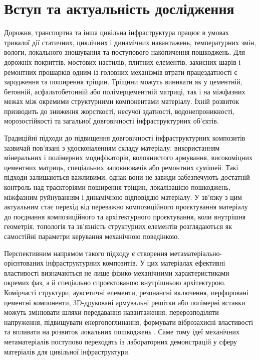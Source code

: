 \documentclass[12pt,a4paper]{article}
\begin{document}
\section{Вступ та актуальність дослідження}

Дорожня, транспортна та інша цивільна інфраструктура працює в умовах тривалої дії статичних, циклічних і динамічних навантажень, температурних змін, вологи, локального зношування та поступового накопичення пошкоджень. Для дорожніх покриттів, мостових настилів, плитних елементів, захисних шарів і ремонтних прошарків одним із головних механізмів втрати працездатності є зародження та поширення тріщин. Тріщини можуть виникати як у цементній, бетонній, асфальтобетонній або полімерцементній матриці, так і на міжфазних межах між окремими структурними компонентами матеріалу. Їхній розвиток призводить до зниження жорсткості, несучої здатності, водонепроникності, морозостійкості та загальної довговічності інфраструктурних об'єктів.

Традиційні підходи до підвищення довговічності інфраструктурних композитів зазвичай пов'язані з удосконаленням складу матеріалу: використанням мінеральних і полімерних модифікаторів, волокнистого армування, високоміцних цементних матриць, спеціальних заповнювачів або ремонтних сумішей. Такі підходи залишаються важливими, однак вони не завжди забезпечують достатній контроль над траєкторіями поширення тріщин, локалізацією пошкоджень, міжфазним руйнуванням і динамічною відповіддю матеріалу. У зв'язку з цим актуальним стає перехід від переважно композиційного проєктування матеріалу до поєднання композиційного та архітектурного проєктування, коли внутрішня геометрія, топологія та зв'язність структурних елементів розглядаються як самостійні параметри керування механічною поведінкою.

Перспективним напрямом такого підходу є створення метаматеріально-орієнтованих інфраструктурних композитів. У цих матеріалах ефективні властивості визначаються не лише фізико-механічними характеристиками окремих фаз, а й спеціально спроєктованою внутрішньою архітектурою. Комірчасті структури, ауксетичні елементи, резонансні включення, перфоровані цементні компоненти, 3D-друковані армувальні решітки або полімерні вставки можуть змінювати шляхи передавання навантаження, перерозподіляти напруження, підвищувати енергопоглинання, формувати віброзахисні властивості та впливати на розвиток локальних пошкоджень \cite{Moini2024,Premadasa2026,Wang2025,Alavi2026}. Саме тому ідеї механічних метаматеріалів поступово переходять із лабораторних демонстрацій у сферу матеріалів для цивільної інфраструктури.
\end{document}
